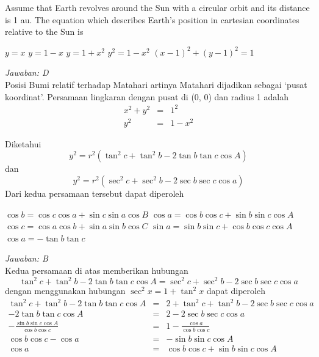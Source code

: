 \documentclass[11pt,fleqn, a4paper]{exam}
\begin{document}
\begin{questions}
\question Assume that Earth revolves around the Sun with a circular orbit and its distance is 1 au. The equation which describes Earth's position in cartesian coordinates relative to the Sun is
\begin{choices}
\choice $y=x$
\choice $y=1-x$
\choice $y=1+x^2$
\choice $y^2=1-x^2$
\choice $(x-1)^{2} + (y-1)^{2} = 1$
\end{choices}

\textit{Jawaban: D}\\
Posisi Bumi relatif terhadap Matahari artinya Matahari dijadikan sebagai `pusat koordinat'. Persamaan lingkaran dengan pusat di (0, 0) dan radius 1 adalah
\begin{eqnarray*}
x^2 + y^2 &=& 1^2\\
y^2 &=& 1 - x^2
\end{eqnarray*}


\vspace{0.5cm}
\question Diketahui 
\begin{equation*}
y^2 = r^2 \left( \tan^{2}{c} + \tan^{2}{b} - 2 \tan{b} \tan{c} \cos{A} \right)
\end{equation*}
dan
\begin{equation*}
y^2 = r^2 \left( \sec^{2}{c} + \sec^{2}{b} - 2 \sec{b} \sec{c} \cos{a} \right)
\end{equation*}
Dari kedua persamaan tersebut dapat diperoleh

\begin{choices}
\choice $\cos{b} = \cos{c} \cos{a} + \sin{c} \sin{a} \cos{B}$
\choice $\cos{a} = \cos{b} \cos{c} + \sin{b} \sin{c} \cos{A}$
\choice $\cos{c} = \cos{a} \cos{b} + \sin{a} \sin{b} \cos{C}$
\choice $\sin{a} = \sin{b} \sin{c} + \cos{b} \cos{c} \cos{A}$
\choice $\cos{a} = -\tan{b} \tan{c}$
\end{choices}

\textit{Jawaban: B}\\
Kedua persamaan di atas memberikan hubungan
\begin{equation*}
\tan^{2}{c} + \tan^{2}{b} - 2 \tan{b} \tan{c} \cos{A} = \sec^{2}{c} + \sec^{2}{b} - 2 \sec{b} \sec{c} \cos{a}
\end{equation*}
dengan menggunakan hubungan $\sec^{2}{x} = 1 + \tan^{2}{x}$ dapat diperoleh 
\begin{eqnarray*}
\tan^{2}{c} + \tan^{2}{b} - 2 \tan{b} \tan{c} \cos{A} &=& 2 + \tan^{2}{c} + \tan^{2}{b} - 2 \sec{b} \sec{c} \cos{a}\\
- 2 \tan{b} \tan{c} \cos{A} &=& 2 - 2 \sec{b} \sec{c} \cos{a}\\
- \frac{\sin{b} \sin{c} \cos{A}}{\cos{b} \cos{c}} &=& 1 - \frac{\cos{a}}{\cos{b} \cos{c}}\\
\cos{b} \cos{c} - \cos{a} &=& - \sin{b} \sin{c} \cos{A}\\
\cos{a} &=& \cos{b} \cos{c} + \sin{b} \sin{c} \cos{A}
\end{eqnarray*}



\end{questions}
\end{document}
